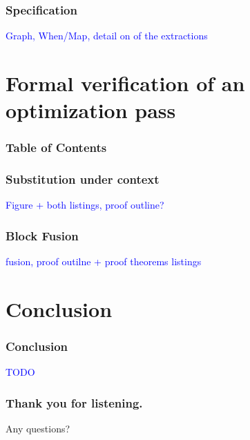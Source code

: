 \documentclass{beamer}
\newcommand{\leon}[1]{\textcolor{blue}{#1}}
\begin{document}
\begin{frame}
  \frametitle{Specification}
  \leon{Graph, When/Map, detail on of the extractions}
\end{frame}

\section{Formal verification of an optimization pass}

\begin{frame}
  \frametitle{Table of Contents}
  \tableofcontents[currentsection]
\end{frame}

\begin{frame}
  \frametitle{Substitution under context}
  \leon{Figure + both listings, proof outline?}
\end{frame}

\begin{frame}
  \frametitle{Block Fusion}
  \leon{fusion, proof outilne + proof theorems listings}
\end{frame}

\section*{Conclusion}

\begin{frame}
  \frametitle{Conclusion}
  \leon{TODO}
\end{frame}

\begin{frame}
  \frametitle{Thank you for listening.}
  Any questions?
\end{frame}
\end{document}
